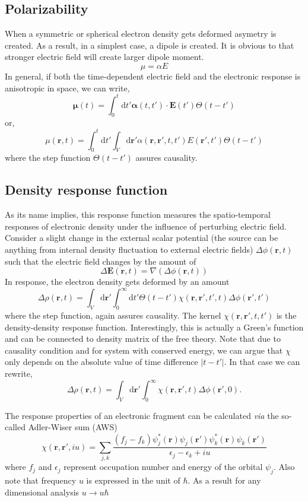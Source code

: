 \documentclass[jcp,groupaddress]{revtex4-1}
\newcommand{\dotproduct}[2]
{
#1 \cdot #2
}
\newcommand{\eq}{\begin{equation}}
\newcommand{\qe}{\end{equation}}
\newcommand{\diff}{\mathrm{d}}
\newcommand{\rr}{\mathbf{r}}
\newcommand{\abs}[1]{\vert #1\vert}
\newcommand{\via}{\emph{via }}
\begin{document}
\subsection{Polarizability}
When a symmetric or spherical electron density gets deformed asymetry is created. As a result, in a simplest case, a dipole is created. It is obvious to that stronger electric field will create larger dipole moment. 
\begin{equation}
 \mu = \alpha E
\end{equation} 
  In general, if both the time-dependent electric field and the electronic response is anisotropic in space, we can write,
\eq
\boldsymbol{\mu} (t)= \int_{0}^{t} \diff t' \dotproduct{\boldsymbol{\alpha}(t,t')}{\mathbf{E}(t')}\Theta(t-t')
\qe
 or,
\eq
\mu(\rr, t) =  \int_{0}^{t} \diff t' \int_{V} \diff \rr' \alpha(\rr,\rr',t, t' )E(\rr', t')\Theta(t-t')
\qe
where the step function $\Theta(t-t')$ assures causality.\\
\subsection{Density response function}
As its name implies, this response function measures the spatio-temporal responses of electronic density under the influence of perturbing electric field. Consider a slight change in the external scalar potential (the source can be anything from internal density fluctuation to external electric fields) $\Delta \phi(\mathbf{r}, t)$ such that the electric field changes by the amount of 
\eq
 \Delta \mathbf{E}(\mathbf{r}, t) = \nabla(\Delta \phi(\mathbf{r}, t))
\qe
In response, the electron density gets deformed by an amount
\eq
\Delta \rho(\mathbf{r}, t) = \int_{V} \diff \mathbf{r}' \int_{0}^{\infty} \diff t' \Theta(t - t') \chi(\mathbf{r},\mathbf{r}', t', t) \Delta \phi(\mathbf{r}', t') 
\qe
where the step function, again assures causality. The kernel $\chi(\rr, \rr', t, t')$ is the density-density response function. Interestingly, this is actually a Green's function and can be connected to density matrix of the free theory.  Note that due to causality condition and for system with conserved energy, we can argue that $\chi$ only depends on the absolute value of time difference $\abs{t-t'}$. In that case we can rewrite,
\eq
\Delta \rho(\mathbf{r}, t) = \int_{V} \diff \mathbf{r}' \int_{0}^{\infty} \chi(\mathbf{r},\mathbf{r}', t) \Delta \phi(\mathbf{r}', 0).
\qe

\par The response properties of an electronic fragment can be calculated \via the so-called Adler-Wiser sum (AWS)
\eq\label{awsum}
\chi(\rr, \rr', i u) = \sum_{j,k}\frac{(f_{j}-f_{k})\psi_{j}^{*}(\rr)\psi_{j}(\rr')\psi_{k}^{*}(\rr)\psi_{k}(\rr')}{\epsilon_{j}-\epsilon_{k}+ i u}
\qe
where $f_{j}$ and $\epsilon_{j}$ represent occupation number and energy of the orbital $\psi_{j}$. Also note that frequency $u$ is expressed in the unit of $\hbar$. As a result for any dimensional analysis $u \rightarrow u \hbar$\\
\end{document}
